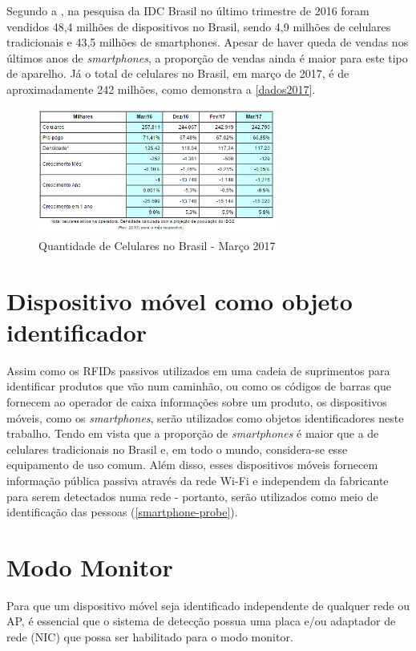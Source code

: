 Segundo a , na pesquisa da IDC Brasil
no último trimestre de 2016 foram vendidos 48,4 milhões de dispositivos no Brasil, sendo 4,9 milhões de celulares tradicionais e 43,5
milhões de smartphones. Apesar
de haver queda de vendas nos últimos anos de \emph{smartphones}, a proporção de vendas ainda é maior para este tipo de aparelho. Já o total
de celulares no Brasil, em março de 2017, é de aproximadamente 242 milhões, como demonstra a \autoref{dados2017}.

\begin{figure}[!h]
  \caption{\label{dados2017}Quantidade de Celulares no Brasil - Março 2017}
  \begin{center}
    \includegraphics[width=0.7\textwidth]{img/dados2017.png}
  \end{center}
\end{figure}

\section{Dispositivo móvel como objeto identificador}
\label{dispositivo-coisa}
Assim como os RFIDs passivos utilizados em uma cadeia de suprimentos para identificar produtos que vão num caminhão, ou como os códigos de barras
que fornecem ao operador de caixa informações sobre um produto, os dispositivos móveis, como os \emph{smartphones}, serão utilizados
como objetos identificadores neste trabalho. Tendo em vista que a proporção de \emph{smartphones} é maior que a de celulares tradicionais no Brasil e, em
todo o mundo, considera-se esse equipamento de uso comum. Além disso, esses dispositivos móveis fornecem informação pública passiva
através da rede Wi-Fi e independem da fabricante para serem detectados numa rede - portanto, serão utilizados como meio
de identificação das pessoas (\autoref{smartphone-probe}).

\section{Modo Monitor}
\label{modo-monitor}
Para que um dispositivo móvel seja identificado independente de qualquer rede ou AP, é essencial que o sistema de detecção possua uma placa e/ou adaptador de rede (NIC) que possa ser habilitado para o modo monitor.

